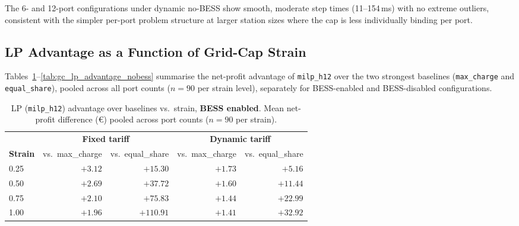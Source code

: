 The 6- and 12-port configurations under dynamic no-BESS show smooth, moderate
step times (11–154\,ms) with no extreme outliers, consistent with the simpler
per-port problem structure at larger station sizes where the cap is less
individually binding per port.

\subsection{LP Advantage as a Function of Grid-Cap Strain}
\label{subsec:gc_lp_advantage}

Tables~\ref{tab:gc_lp_advantage_bess}--\ref{tab:gc_lp_advantage_nobess}
summarise the net-profit advantage of \texttt{milp\_h12} over the two
strongest baselines (\texttt{max\_charge} and \texttt{equal\_share}),
pooled across all port counts ($n = 90$ per strain level), separately for
BESS-enabled and BESS-disabled configurations.

\begin{table}[!htb]
\centering
\caption{LP (\texttt{milp\_h12}) advantage over baselines vs.\ strain,
         \textbf{BESS enabled}.  Mean net-profit difference (€) pooled
         across port counts ($n=90$ per strain).}
\label{tab:gc_lp_advantage_bess}
\begin{tabular}{l rr rr}
\toprule
 & \multicolumn{2}{c}{\textbf{Fixed tariff}}
 & \multicolumn{2}{c}{\textbf{Dynamic tariff}} \\
\cmidrule(lr){2-3}\cmidrule(lr){4-5}
\textbf{Strain} & vs.\ max\_charge & vs.\ equal\_share
                & vs.\ max\_charge & vs.\ equal\_share \\
\midrule
0.25 & $+3.12$ & $+15.30$ & $+1.73$ & $+5.16$ \\
0.50 & $+2.69$ & $+37.72$ & $+1.60$ & $+11.44$ \\
0.75 & $+2.10$ & $+75.83$ & $+1.44$ & $+22.99$ \\
1.00 & $+1.96$ & $+110.91$ & $+1.41$ & $+32.92$ \\
\bottomrule
\end{tabular}
\end{table}

